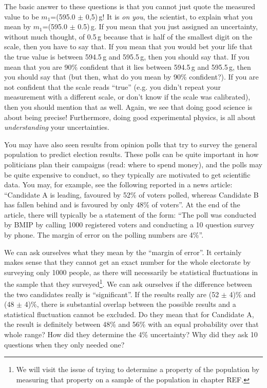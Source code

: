 The basic answer to these questions is that you cannot just quote the measured value to be $m_1$=(595.0 $\pm$ 0,5)\,g! It is \textit{on you}, the scientist, to explain what you mean by $m_1$=(595.0 $\pm$ 0.5)\,g. If you mean that you just assigned an uncertainty, without much thought, of 0.5\,g because that is half of the smallest digit on the scale, then you have to say that. If you mean that you would bet your life that the true value is between 594.5\,g and 595.5\,g, then you should say that. If you mean that you are 90\% confident that it lies between 594.5\,g and 595.5\,g, then you should say that (but then, what do you mean by 90\% confident?). If you are not confident that the scale reads ``true'' (e.g. you didn't repeat your measurement with a different scale, or don't know if the scale was calibrated), then you should mention that as well. Again, we see that doing good science is about being precise! Furthermore, doing good experimental physics, is all about \textit{understanding} your uncertainties.

You may have also seen results from opinion polls that try to survey the general population to predict election results. These polls can be quite important in how politicians plan their campaigns (read: where to spend money), and the polls may be quite expensive to conduct, so they typically are motivated to get scientific data. You may, for example, see the following reported in a news article: ``Candidate A is leading, favoured by 52\% of voters polled, whereas Candidate B has fallen behind and is favoured by only 48\% of voters''. At the end of the article, there will typically be a statement of the form: ``The poll was conducted by BMIP by calling 1000 registered voters and conducting a 10 question survey by phone. The margin of error on the polling numbers are 4\%''.

We can ask ourselves what they mean by the ``margin of error''. It certainly makes sense that they cannot get an exact number for the whole electorate by surveying only 1000 people, as there will necessarily be statistical fluctuations in the sample that they surveyed\footnote{We will visit the issue of trying to determine a property of the population by measuring that property on a sample of the population in chapter REF.}. We can ask ourselves if the difference between the two candidates really is ``significant''. If the results really are (52 $\pm$ 4)\% and (48 $\pm$ 4)\%, there is substantial overlap between the possible results and a statistical fluctuation cannot be excluded. Do they mean that for Candidate A, the result is definitely between 48\% and 56\% with an equal probability over that whole range? How did they determine the 4\% uncertainty? Why did they ask 10 questions when they only needed one?

